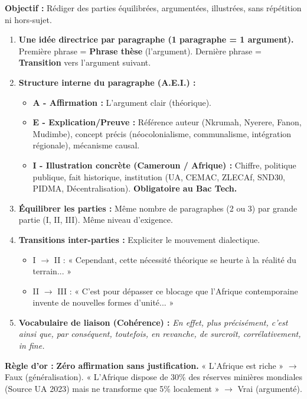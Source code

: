 \documentclass[11pt]{article}
\newcommand{\cle}[1]{{\popxbold\color{popdark}#1}}
\begin{document}
\begin{methode}
\textbf{Objectif :} Rédiger des parties équilibrées, argumentées, illustrées, sans répétition ni hors-sujet.
\begin{enumerate}
    \item \textbf{Une idée directrice par paragraphe (1 paragraphe = 1 argument).} Première phrase = \textbf{Phrase thèse} (l'argument). Dernière phrase = \textbf{Transition} vers l'argument suivant.
    \item \textbf{Structure interne du paragraphe (A.E.I.) :}
        \begin{itemize}
            \item \textbf{A - Affirmation :} L'argument clair (théorique).
            \item \textbf{E - Explication/Preuve :} Référence auteur (\cle{Nkrumah}, \cle{Nyerere}, \cle{Fanon}, \cle{Mudimbe}), concept précis (\cle{néocolonialisme}, \cle{communalisme}, \cle{intégration régionale}), mécanisme causal.
            \item \textbf{I - Illustration concrète (Cameroun / Afrique) :} Chiffre, politique publique, fait historique, institution (UA, CEMAC, ZLECAf, SND30, PIDMA, Décentralisation). \textbf{Obligatoire au Bac Tech.}
        \end{itemize}
    \item \textbf{Équilibrer les parties :} Même nombre de paragraphes (2 ou 3) par grande partie (I, II, III). Même niveau d'exigence.
    \item \textbf{Transitions inter-parties :} Expliciter le mouvement dialectique.
        \begin{itemize}
            \item I $\rightarrow$ II : « Cependant, cette nécessité théorique se heurte à la réalité du terrain... »
            \item II $\rightarrow$ III : « C'est pour dépasser ce blocage que l'Afrique contemporaine invente de nouvelles formes d'unité... »
        \end{itemize}
    \item \textbf{Vocabulaire de liaison (Cohérence) :} \emph{En effet, plus précisément, c'est ainsi que, par conséquent, toutefois, en revanche, de surcroît, corrélativement, in fine.}
\end{enumerate}
\textbf{Règle d'or :} \textbf{Zéro affirmation sans justification.} « L'Afrique est riche » $\rightarrow$ Faux (généralisation). « L'Afrique dispose de 30\% des réserves minières mondiales (Source UA 2023) mais ne transforme que 5\% localement » $\rightarrow$ Vrai (argumenté).
\end{methode}
\end{document}
